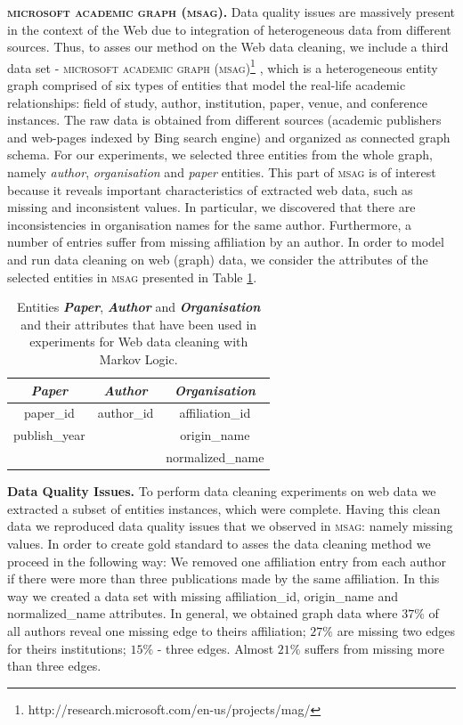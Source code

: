 \textbf{\textsc{microsoft academic graph (msag)}.} Data quality issues are massively present in the context of the Web due to integration of heterogeneous data from different sources. Thus, to asses our method on the Web data cleaning, we include a third data set - \textsc{microsoft academic graph (msag)}\footnote{http://research.microsoft.com/en-us/projects/mag/} \cite{msag2015}, which is a heterogeneous entity graph comprised of six types of entities that model the real-life academic relationships: field of study, author, institution, paper, venue, and conference instances. The raw data is obtained from different sources (academic publishers and web-pages indexed by Bing search engine) and organized as connected graph schema. For our experiments, we selected three entities from the whole graph, namely \textit{author}, \textit{organisation} and \textit{paper} entities. This part of \textsc{msag} is of interest because it reveals important characteristics of extracted web data, such as missing and inconsistent values. In particular, we discovered that there are inconsistencies in organisation names for the same author. Furthermore, a number of entries suffer from missing affiliation by an author. In order to model and run data cleaning on web (graph) data, we consider the attributes of the selected entities in \textsc{msag} presented in Table \ref{tab:msagattrs}. 
\begin{table}[t]\footnotesize
\scriptsize
\centering
\begin{tabular}{ccc}
\textbf{\textit{Paper}}         & \textbf{\textit{Author}}     & \textbf{\textit{Organisation}}      \\ \hline
\textsf{paper\_id}     & \textsf{author\_id} & \textsf{affiliation\_id}  \\
\textsf{publish\_year} &            & \textsf{origin\_name}     \\
              &            & \textsf{normalized\_name}\\ \hline
\end{tabular}
\caption{Entities \textbf{\textit{Paper}}, \textbf{\textit{Author}} and \textbf{\textit{Organisation}} and their attributes that have been used in experiments for Web data cleaning with Markov Logic.}
    \label{tab:msagattrs}
\end{table}

\textbf{Data Quality Issues.} To perform data cleaning experiments on web data we extracted a subset of entities instances, which were complete. Having this clean data we reproduced data quality issues that we observed in \textsc{msag}: namely missing values. In order to create gold standard to asses the data cleaning method we proceed in the following way: We removed one affiliation entry from each author if there were more than three publications made by the same affiliation. In this way we created a data set with missing \textsf{affiliation\_id}, \textsf{origin\_name} and \textsf{normalized\_name} attributes. In general, we obtained graph data where $37\%$ of all authors reveal one missing edge to theirs affiliation; $27\%$ are missing two edges for theirs institutions; $15\%$ - three edges. Almost $21\%$ suffers from missing more than three edges. 

